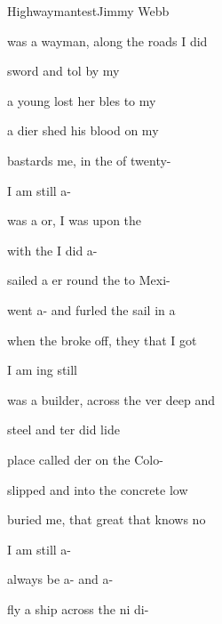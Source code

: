 \begin{SBSong}{Highwayman}{test}{Jimmy Webb}
  \begin{SBVerse}
     was a wayman, along the  roads I did 

     sword and tol by my 

     a young  lost her bles to my 

     a dier shed his blood on my 

     bastards  me, in the  of twenty-

     I am still a-
  \end{SBVerse}
  \begin{SBVerse}
     was a or, I was  upon the 

     with the  I did a-

     sailed a er round the  to Mexi-

     went a- and furled the sail in a 

     when the  broke off, they  that I got 

     I am ing still
  \end{SBVerse}
  \begin{SBVerse}
     was a  builder, across the ver deep and 

     steel and ter did lide

     place called der on the  Colo-

     slipped and  into the  concrete low

     buried me,  that great  that knows no 

     I am still a-

     always be a- and a-   
  \end{SBVerse}
  \begin{SBVerse}
     fly a ship across the ni di-


\end{SBVerse}
\end{SBSong}
